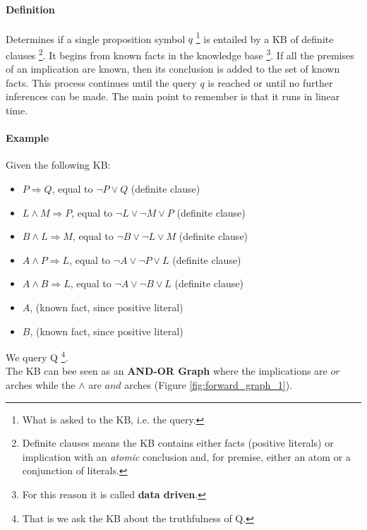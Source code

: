 \documentclass[10pt,a4paper]{article}
\begin{document}
\paragraph{Definition}
Determines if a single proposition symbol $q$ \footnote{What is asked to the KB, i.e. the query.} is entailed by a KB of definite clauses \footnote{Definite clauses means the KB contains either facts (positive literals) or implication with an \textit{atomic} conclusion and, for premise, either an atom or a conjunction of literals. }. It begins from known facts in the knowledge base \footnote{For this reason it is called \textbf{data driven}.}. If all the premises of an implication are known, then its conclusion is added to the set of known facts. This process continues until the query $q$ is reached or until no further inferences can be made. The main point to remember is that it runs in linear time.

\paragraph{Example}
Given the following KB:
\begin{itemize}
\item $P \Rightarrow Q$, equal to $\neg P \vee Q$ (definite clause)
\item $L \wedge M \Rightarrow P$, equal to $\neg L \vee \neg M \vee P$ (definite clause)
\item $B \wedge L \Rightarrow M$, equal to $\neg B \vee \neg L \vee M$ (definite clause)
\item $A \wedge P \Rightarrow L$, equal to $\neg A \vee \neg P \vee L$ (definite clause)
\item $A \wedge B \Rightarrow L$, equal to $\neg A \vee \neg B \vee L$ (definite clause)
\item $A$, (known fact, since positive literal)
\item $B$, (known fact, since positive literal)
\end{itemize}
We query Q \footnote{That is we ask the KB about the truthfulness of Q.}.\\
 The KB can bee seen as an \textbf{AND-OR Graph} where the implications are $or$ arches while the $\wedge$ are $and$ arches (Figure \ref{fig:forward_graph_1}).\\
\end{document}

